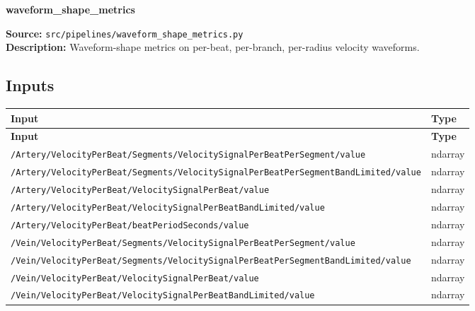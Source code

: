\documentclass[11pt]{article}
\begin{document}
\begin{center}
\LARGE\textbf{waveform\_shape\_metrics}
\end{center}
\textbf{Source:} \texttt{src/\allowbreak{}pipelines/\allowbreak{}waveform\_\allowbreak{}shape\_\allowbreak{}metrics.py}\\
\textbf{Description:} Waveform-shape metrics on per-beat, per-branch, per-radius velocity waveforms.

\subsection*{Inputs}
\begin{longtable}{|p{}|p{}|}
\hline
\textbf{Input} & \textbf{Type} \\ \hline
\endfirsthead
\hline
\textbf{Input} & \textbf{Type} \\ \hline
\endhead
{\scriptsize \texttt{/\allowbreak{}Artery/\allowbreak{}VelocityPerBeat/\allowbreak{}Segments/\allowbreak{}VelocitySignalPerBeatPerSegment/\allowbreak{}value}} & ndarray \\ \hline
{\scriptsize \texttt{/\allowbreak{}Artery/\allowbreak{}VelocityPerBeat/\allowbreak{}Segments/\allowbreak{}VelocitySignalPerBeatPerSegmentBandLimited/\allowbreak{}value}} & ndarray \\ \hline
{\scriptsize \texttt{/\allowbreak{}Artery/\allowbreak{}VelocityPerBeat/\allowbreak{}VelocitySignalPerBeat/\allowbreak{}value}} & ndarray \\ \hline
{\scriptsize \texttt{/\allowbreak{}Artery/\allowbreak{}VelocityPerBeat/\allowbreak{}VelocitySignalPerBeatBandLimited/\allowbreak{}value}} & ndarray \\ \hline
{\scriptsize \texttt{/\allowbreak{}Artery/\allowbreak{}VelocityPerBeat/\allowbreak{}beatPeriodSeconds/\allowbreak{}value}} & ndarray \\ \hline
{\scriptsize \texttt{/\allowbreak{}Vein/\allowbreak{}VelocityPerBeat/\allowbreak{}Segments/\allowbreak{}VelocitySignalPerBeatPerSegment/\allowbreak{}value}} & ndarray \\ \hline
{\scriptsize \texttt{/\allowbreak{}Vein/\allowbreak{}VelocityPerBeat/\allowbreak{}Segments/\allowbreak{}VelocitySignalPerBeatPerSegmentBandLimited/\allowbreak{}value}} & ndarray \\ \hline
{\scriptsize \texttt{/\allowbreak{}Vein/\allowbreak{}VelocityPerBeat/\allowbreak{}VelocitySignalPerBeat/\allowbreak{}value}} & ndarray \\ \hline
{\scriptsize \texttt{/\allowbreak{}Vein/\allowbreak{}VelocityPerBeat/\allowbreak{}VelocitySignalPerBeatBandLimited/\allowbreak{}value}} & ndarray \\ \hline
\end{longtable}
\end{document}
